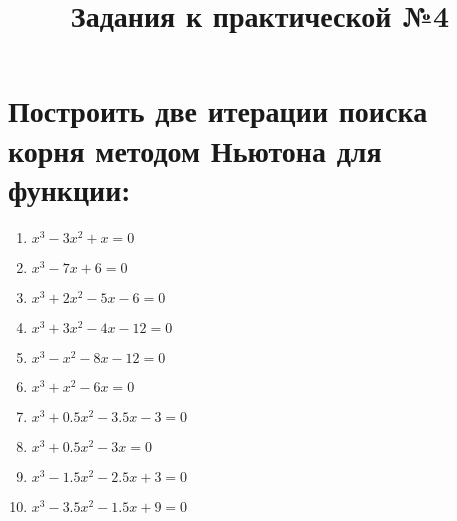 \documentclass{article}
\title{Задания к практической №4}
\begin{document}
\section{Построить две итерации поиска корня методом Ньютона для функции:}
\begin{enumerate}
  \item $x^3 - 3x^2 + x = 0$
  \item $x^3 - 7x + 6 = 0$
  \item $x^3 + 2x^2 - 5x - 6 = 0$
  \item $x^3 + 3x^2 - 4x - 12 = 0$
  \item $x^3 - x^2 - 8x - 12 = 0$

  \item $x^3 + x^2 - 6x = 0$
  \item $x^3 + 0.5x^2 - 3.5x -3 = 0$
  \item $x^3 + 0.5x^2 - 3x = 0$
  \item $x^3 - 1.5x^2 - 2.5x + 3 = 0$
  \item $x^3 - 3.5x^2 - 1.5x + 9 = 0$
\end{enumerate}		
\end{document}
